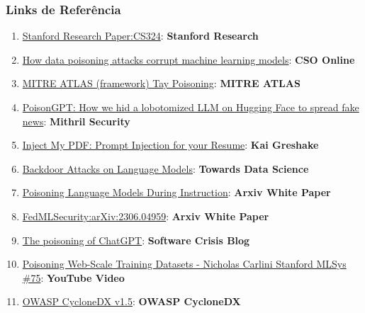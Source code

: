 \documentclass[
]{article}
\providecommand{\tightlist}{%
  \setlength{\itemsep}{0pt}\setlength{\parskip}{0pt}}
\begin{document}
\subsubsection{Links de Referência}\label{links-de-referuxeancia}

\begin{enumerate}
\def\labelenumi{\arabic{enumi}.}
\tightlist
\item
  \href{https://stanford-cs324.github.io/winter2022/lectures/data/}{Stanford
  Research Paper:CS324}: \textbf{Stanford Research}
\item
  \href{https://www.csoonline.com/article/3613932/how-data-poisoning-attacks-corrupt-machine-learning-models.html}{How
  data poisoning attacks corrupt machine learning models}: \textbf{CSO
  Online}
\item
  \href{https://atlas.mitre.org/studies/AML.CS0009/}{MITRE ATLAS
  (framework) Tay Poisoning}: \textbf{MITRE ATLAS}
\item
  \href{https://blog.mithrilsecurity.io/poisongpt-how-we-hid-a-lobotomized-llm-on-hugging-face-to-spread-fake-news/}{PoisonGPT:
  How we hid a lobotomized LLM on Hugging Face to spread fake news}:
  \textbf{Mithril Security}
\item
  \href{https://kai-greshake.de/posts/inject-my-pdf/}{Inject My PDF:
  Prompt Injection for your Resume}: \textbf{Kai Greshake}
\item
  \href{https://towardsdatascience.com/backdoor-attacks-on-language-models-can-we-trust-our-models-weights-73108f9dcb1f}{Backdoor
  Attacks on Language Models}: \textbf{Towards Data Science}
\item
  \href{https://arxiv.org/abs/2305.00944}{Poisoning Language Models
  During Instruction}: \textbf{Arxiv White Paper}
\item
  \href{https://arxiv.org/abs/2306.04959}{FedMLSecurity:arXiv:2306.04959}:
  \textbf{Arxiv White Paper}
\item
  \href{https://softwarecrisis.dev/letters/the-poisoning-of-chatgpt/}{The
  poisoning of ChatGPT}: \textbf{Software Crisis Blog}
\item
  \href{https://www.youtube.com/watch?v=h9jf1ikcGyk}{Poisoning Web-Scale
  Training Datasets - Nicholas Carlini \textbar{} Stanford MLSys \#75}:
  \textbf{YouTube Video}
\item
  \href{https://cyclonedx.org/capabilities/mlbom/}{OWASP CycloneDX
  v1.5}: \textbf{OWASP CycloneDX}
\end{enumerate}
\end{document}
